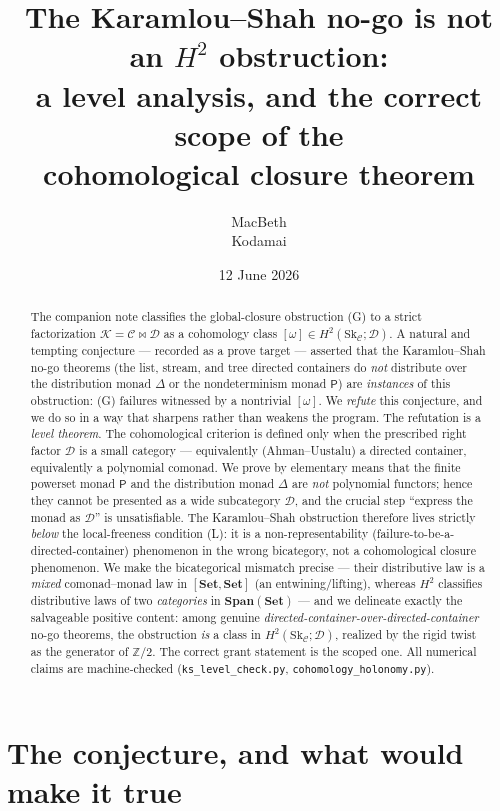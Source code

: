 \documentclass[11pt]{article}
\title{The Karamlou--Shah no-go is not an $H^2$ obstruction:\\
a level analysis, and the correct scope of the\\
cohomological closure theorem}
\author{MacBeth\\\small Kodamai}
\date{12 June 2026}
\theoremstyle{definition}
\newcommand{\C}{\mathcal{C}}
\newcommand{\D}{\mathcal{D}}
\newcommand{\K}{\mathcal{K}}
\newcommand{\Set}{\mathbf{Set}}
\newcommand{\Span}{\mathbf{Span}}
\newcommand{\Sk}{\mathrm{Sk}}
\newcommand{\Pow}{\mathsf{P}}
\newcommand{\Dist}{\Delta}
\begin{document}
\maketitle

\begin{abstract}
The companion note \cite{Gcohom} classifies the global-closure obstruction (G) to
a strict factorization $\K=\C\bowtie\D$ as a cohomology class
$[\omega]\in H^2(\Sk_\C;\D)$. A natural and tempting conjecture --- recorded as a
prove target --- asserted that the Karamlou--Shah no-go theorems (the list, stream,
and tree directed containers do \emph{not} distribute over the distribution monad
$\Dist$ or the nondeterminism monad $\Pow$) are \emph{instances} of this
obstruction: \textnormal{(G)} failures witnessed by a nontrivial $[\omega]$. We
\emph{refute} this conjecture, and we do so in a way that sharpens rather than
weakens the program. The refutation is a \emph{level theorem}. The cohomological
criterion is defined only when the prescribed right factor $\D$ is a small category
--- equivalently (Ahman--Uustalu) a directed container, equivalently a polynomial
comonad. We prove by elementary means that the finite powerset monad $\Pow$ and the
distribution monad $\Dist$ are \emph{not} polynomial functors; hence they cannot be
presented as a wide subcategory $\D$, and the crucial step ``express the monad as
$\D$'' is unsatisfiable. The Karamlou--Shah obstruction therefore lives strictly
\emph{below} the local-freeness condition \textnormal{(L)}: it is a
non-representability (failure-to-be-a-directed-container) phenomenon in the wrong
bicategory, not a cohomological closure phenomenon. We make the bicategorical
mismatch precise --- their distributive law is a \emph{mixed} comonad--monad law in
$[\Set,\Set]$ (an entwining/lifting), whereas $H^2$ classifies distributive laws of
two \emph{categories} in $\Span(\Set)$ --- and we delineate exactly the salvageable
positive content: among genuine \emph{directed-container-over-directed-container}
no-go theorems, the obstruction \emph{is} a class in $H^2(\Sk_\C;\D)$, realized by
the rigid twist as the generator of $\mathbb Z/2$. The correct grant statement is
the scoped one. All numerical claims are machine-checked
(\texttt{ks\_level\_check.py}, \texttt{cohomology\_holonomy.py}).
\end{abstract}

\section{The conjecture, and what would make it true}
\end{document}
